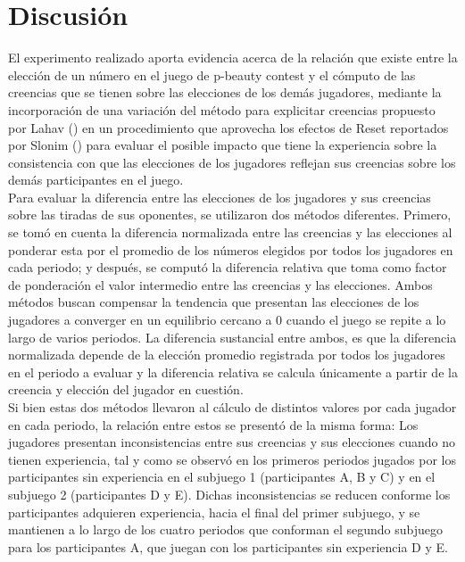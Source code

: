 
\chapter{Discusión} %

\label{Cap_Disc} %

El experimento realizado aporta evidencia acerca de la relación que existe entre la elección de un número en el juego de p-beauty contest y el cómputo de las creencias que se tienen sobre las elecciones de los demás jugadores, mediante la incorporación de una variación del método para explicitar creencias propuesto por Lahav (\citeyear{Lahav}) en un procedimiento que aprovecha los efectos de Reset reportados por Slonim (\citeyear{Slonim}) para evaluar el posible impacto que tiene la experiencia sobre la consistencia con que las elecciones de los jugadores reflejan sus creencias sobre los demás participantes en el juego. \\

Para evaluar la diferencia entre las elecciones de los jugadores y sus creencias sobre las tiradas de sus oponentes, se utilizaron dos métodos diferentes. Primero, se tomó en cuenta la diferencia normalizada entre las creencias y las elecciones al ponderar esta por el promedio de los números elegidos por todos los jugadores en cada periodo; y después, se computó la diferencia relativa que toma como factor de ponderación el valor intermedio entre las creencias y las elecciones. Ambos métodos buscan compensar la tendencia que presentan las elecciones de los jugadores a converger en un equilibrio cercano a 0 cuando el juego se repite a lo largo de varios periodos. La diferencia sustancial entre ambos, es que la diferencia normalizada depende de la elección promedio registrada por todos los jugadores en el periodo a evaluar y  la diferencia relativa se calcula únicamente a partir de la creencia y elección del jugador en cuestión.\\

Si bien estas dos métodos llevaron al cálculo de distintos valores por cada jugador en cada periodo,  la relación entre estos se presentó de la misma forma: Los jugadores presentan inconsistencias entre sus creencias y sus elecciones cuando no tienen experiencia, tal y como se observó en los primeros periodos jugados por los participantes sin experiencia en el subjuego 1 (participantes A, B y C)  y en  el subjuego 2 (participantes D y E). Dichas inconsistencias se reducen conforme los participantes adquieren experiencia, hacia el final del primer subjuego, y se mantienen a lo largo de los cuatro periodos que conforman el segundo subjuego para los participantes A, que juegan con los participantes sin experiencia D y E.\\

